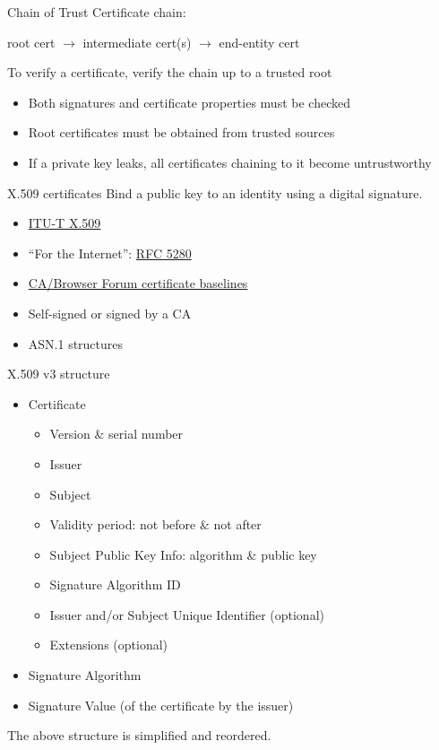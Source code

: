 \begin{frame}{Chain of Trust}
  Certificate chain:
  \begin{center}
    root cert $\to$ intermediate cert(s) $\to$ end-entity cert
  \end{center}

  \vspace*{1em}

  \pause
  To verify a certificate, verify the chain up to a trusted root
  \begin{itemize}[<+(1)->]
    \item Both signatures and certificate properties must be checked
    \item Root certificates must be obtained from trusted sources
    \item If a private key leaks, all certificates chaining to it become untrustworthy
  \end{itemize}
\end{frame}

\begin{frame}{X.509 certificates}
  \pause
  Bind a public key to an identity using a digital signature.
  \begin{itemize}[<+(1)->]
    \item \href{https://www.itu.int/rec/T-REC-X.509}{ITU-T X.509}
    \item \enquote{For the Internet}: \href{https://datatracker.ietf.org/doc/html/rfc5280}{RFC 5280}
    \item \href{https://cabforum.org}{CA/Browser Forum certificate baselines}
    \item Self-signed or signed by a CA
    \item ASN.1 structures
  \end{itemize}
\end{frame}

\begin{frame}{X.509 v3 structure}
  \begin{itemize}[<+(1)->]
    \item Certificate
    \begin{itemize}
      \item Version \& serial number
      \item Issuer
      \item Subject
      \item Validity period: not before \& not after
      \item Subject Public Key Info: algorithm \& public key
      \item Signature Algorithm ID
      \item Issuer and/or Subject Unique Identifier (optional)
      \item Extensions (optional)
    \end{itemize}
    \item Signature Algorithm
    \item Signature Value (of the certificate by the issuer)
  \end{itemize}

  \pause
  The above structure is simplified and reordered.
\end{frame}

